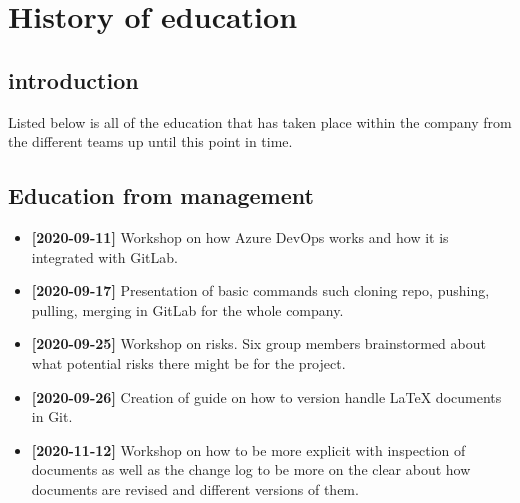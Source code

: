 \documentclass[12pt]{article}
\begin{document}
    \section{History of education}
    \subsection{introduction}
    Listed below is all of the education that has taken place within the company from the different teams up until this point in time. 
\subsection{Education from management}
\begin{itemize}
 \item \textbf{[2020-09-11]} Workshop on how Azure DevOps works and how it is integrated with GitLab.
    \item \textbf{[2020-09-17]} Presentation of basic commands such cloning repo, pushing, pulling, merging in GitLab for the whole company. 
        \item \textbf{[2020-09-25]} Workshop on risks. Six group members brainstormed about what potential risks there might be for the project.

    \item \textbf{[2020-09-26]} Creation of guide on how to version handle LaTeX documents in Git.
    \item \textbf{[2020-11-12]} Workshop on how to be more explicit with inspection of documents as well as the change log to be more on the clear about how documents are revised and different versions of them. 
\end{itemize}
\end{document}
